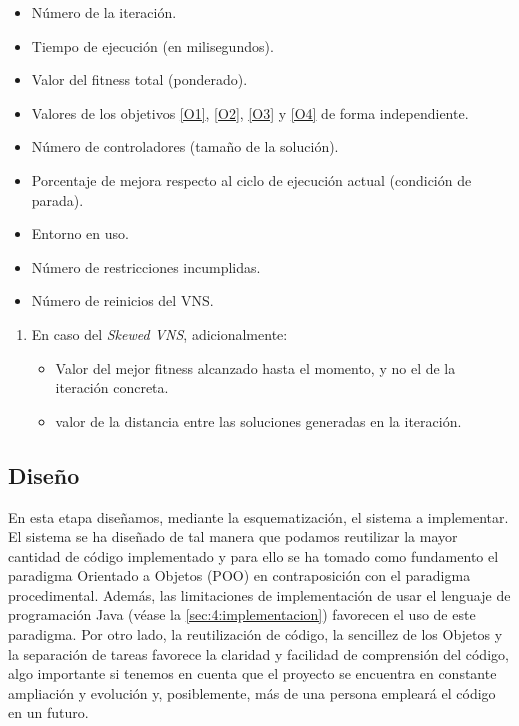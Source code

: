 \begin{enumerate}[label={\textbf{RIO\arabic*}}, ref={Requisito RIO\arabic*},  align=left]
\begin{enumerate}[label*={\textbf{.\arabic*}}]
\begin{itemize}
			\item Número de la iteración.
			\item Tiempo de ejecución (en milisegundos).
			\item Valor del fitness total (ponderado).
			\item Valores de los objetivos \ref{O1}, \ref{O2}, \ref{O3} y \ref{O4} de forma independiente.
			\item Número de controladores (tamaño de la solución).
			\item Porcentaje de mejora respecto al ciclo de ejecución actual (condición de parada).
			\item Entorno en uso.
			\item Número de restricciones incumplidas.
			\item Número de reinicios del VNS.
		\end{itemize}
		\begin{enumerate}[label*={\textbf{.\arabic*}}]
			\item En caso del \textit{Skewed VNS}, adicionalmente:
			\begin{itemize}
				\item Valor del mejor fitness alcanzado hasta el momento, y no el de la iteración concreta.
				\item valor de la distancia entre las soluciones generadas en la iteración.
			\end{itemize}
		\end{enumerate}	
	\end{enumerate}
\end{enumerate}


\subsection{Diseño}
\label{sec:4:diseño}

En esta etapa diseñamos, mediante la esquematización, el sistema a implementar. 
El sistema se ha diseñado de tal manera que podamos reutilizar la mayor cantidad de código implementado y para ello se ha tomado como fundamento el paradigma Orientado a Objetos (POO) en contraposición con el paradigma procedimental. 
Además, las limitaciones de implementación de usar el lenguaje de programación Java (véase la \autoref{sec:4:implementacion}) favorecen el uso de este paradigma. 
Por otro lado, la reutilización de código, la sencillez de los Objetos y la separación de tareas favorece la claridad y facilidad de comprensión del código, algo importante si tenemos en cuenta que el proyecto se encuentra en constante ampliación y evolución y, posiblemente, más de una persona empleará el código en un futuro. 

